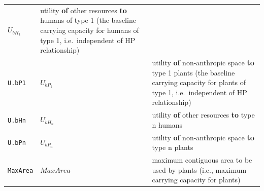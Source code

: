 \documentclass[]{book}
\begin{document}
\begin{longtable}[]{@{}lll@{}}
\begin{minipage}[t]{0.25\columnwidth}
\(U_{bH_{1}}\)\strut
\end{minipage} & \begin{minipage}[t]{0.40\columnwidth}\raggedright
utility \textbf{of} other resources \textbf{to} humans of type 1 (the baseline carrying capacity for humans of type 1, i.e.~independent of HP relationship)\strut
\end{minipage}\tabularnewline
\begin{minipage}[t]{0.27\columnwidth}\raggedright
\texttt{U.bP1}\strut
\end{minipage} & \begin{minipage}[t]{0.25\columnwidth}\raggedright
\(U_{bP_{1}}\)\strut
\end{minipage} & \begin{minipage}[t]{0.40\columnwidth}\raggedright
utility \textbf{of} non-anthropic space \textbf{to} type 1 plants (the baseline carrying capacity for plants of type 1, i.e.~independent of HP relationship)\strut
\end{minipage}\tabularnewline
\begin{minipage}[t]{0.27\columnwidth}\raggedright
\texttt{U.bHn}\strut
\end{minipage} & \begin{minipage}[t]{0.25\columnwidth}\raggedright
\(U_{bH_{n}}\)\strut
\end{minipage} & \begin{minipage}[t]{0.40\columnwidth}\raggedright
utility \textbf{of} other resources \textbf{to} type n humans\strut
\end{minipage}\tabularnewline
\begin{minipage}[t]{0.27\columnwidth}\raggedright
\texttt{U.bPn}\strut
\end{minipage} & \begin{minipage}[t]{0.25\columnwidth}\raggedright
\(U_{bP_{n}}\)\strut
\end{minipage} & \begin{minipage}[t]{0.40\columnwidth}\raggedright
utility \textbf{of} non-anthropic space \textbf{to} type n plants\strut
\end{minipage}\tabularnewline
\begin{minipage}[t]{0.27\columnwidth}\raggedright
\texttt{MaxArea}\strut
\end{minipage} & \begin{minipage}[t]{0.25\columnwidth}\raggedright
\(MaxArea\)\strut
\end{minipage} & \begin{minipage}[t]{0.40\columnwidth}\raggedright
maximum contiguous area to be used by plants (i.e., maximum carrying capacity for plants)\strut
\end{minipage}\tabularnewline
\bottomrule
\end{longtable}
\end{document}

